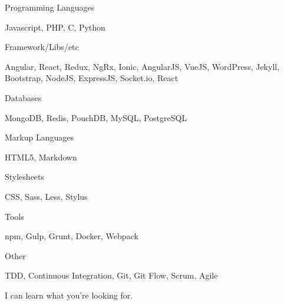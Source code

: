 

\begin{cventries}

  \cventry
    {Programming Languages} %
    {}
    {}
    {}
    {
      \begin{cvitems} %
        \item {Javascript, PHP, C, Python}
      \end{cvitems}
    }
    \cventry
    {Framework/Libs/etc} %
    {}
    {}
    {}
    {
      \begin{cvitems} %
        \item {Angular, React, Redux, NgRx, Ionic, AngularJS, VueJS, WordPress, Jekyll, Bootstrap, NodeJS, ExpressJS, Socket.io, React}
      \end{cvitems}
    }
    \cventry
    {Databases} %
    {}
    {}
    {}
    {
      \begin{cvitems} %
        \item {MongoDB, Redis, PouchDB, MySQL, PostgreSQL}
      \end{cvitems}
    }
    \cventry
    {Markup Languages} %
    {}
    {}
    {}
    {
      \begin{cvitems} %
        \item {HTML5, Markdown}
      \end{cvitems}
    }
    \cventry
    {Stylesheets} %
    {}
    {}
    {}
    {
      \begin{cvitems} %
        \item {CSS, Sass, Less, Stylus}
      \end{cvitems}
    }
    \cventry
    {Tools} %
    {}
    {}
    {}
    {
      \begin{cvitems} %
        \item {npm, Gulp, Grunt, Docker, Webpack}
      \end{cvitems}
    }
    \cventry
    {Other} %
    {}
    {}
    {}
    {
      \begin{cvitems} %
        \item {TDD, Continuous Integration, Git, Git Flow, Scrum, Agile}
        \item {I can learn what you're looking for.}
      \end{cvitems}
    }

\end{cventries}
